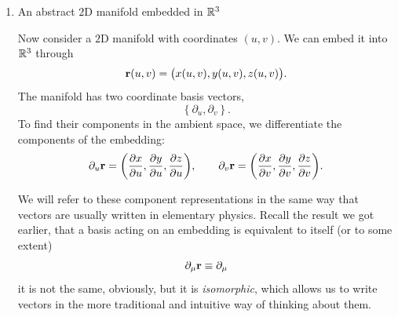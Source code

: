 \begin{enumerate}[(1)]
				The coordinate basis of the tangent space is simply
				\[
					\left\{
						\partial_t
					\right\}.
				\]
				As an ambient vector, this basis vector is obtained by
				differentiating the embedding:
				\[
					\partial_t\vb{r}
					=
					\pdv{x}{t}\vb{e}_x
					+
					\pdv{y}{t}\vb{e}_y.
				\]
				Equivalently,
				\[
					\partial_t\vb{r}
					=
					\pqty{
						\dv{x}{t},
						\dv{y}{t}
					}
				\]

				An arbitrary tangent vector is therefore
				\[
					v=v^t\partial_t.
				\]
				As an ambient vector (the tangent vector acting on an ambient embedding), we can express this explicitly as components.
				\[
					v[\vb{r}]
					=
					v^t\partial_t\vb{r}
					=
					v^t
					\left(
						\dv{x}{t}
						,
						\dv{y}{t}
					\right).
				\]

				Notice what happened here. The manifold has only one intrinsic
				direction, represented by $\partial_t$, even though its embedding
				lives in a two-dimensional ambient space. The vector therefore
				has one intrinsic component $V^t$, while its representation in
				the ambient space has two components.

			\item An abstract $2$D manifold embedded in $\mathbb{R}^3$

				Now consider a $2$D manifold with coordinates $(u,v)$. We can
				embed it into $\mathbb{R}^3$ through
				\[
					\vb{r}(u,v)
					=
					\bigl(
						x(u,v),
						y(u,v),
						z(u,v)
					\bigr).
				\]
				The manifold has two coordinate basis vectors,
				\[
					\left\{
						\partial_u,\partial_v
					\right\}.
				\]
				To find their components in the ambient space, we differentiate
				the components of the embedding:
				\[
					\partial_u\vb{r}
					=
					\pqty{
						\pdv{x}{u},
						\pdv{y}{u},
						\pdv{z}{u}
					},
					\qquad
					\partial_v\vb{r}
					=
					\pqty{
						\pdv{x}{v},
						\pdv{y}{v},
						\pdv{z}{v}
					}.
				\]

				We will refer to these component representations in the same
				way that vectors are usually written in elementary physics. Recall
				the result we got earlier, that a basis acting on an embedding 
				is equivalent to itself (or to some extent)
				\[
				\partial_\mu \vb{r} \equiv \partial_\mu
				\]
				it is not the same, obviously, but it is \textit{isomorphic}, which
				allows us to write vectors in the more traditional and intuitive
				way of thinking about them.


\end{enumerate}
